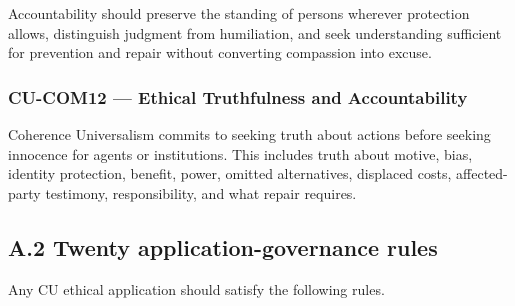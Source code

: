\documentclass[
  11pt,
]{article}
\begin{document}
Accountability should preserve the standing of persons wherever
protection allows, distinguish judgment from humiliation, and seek
understanding sufficient for prevention and repair without converting
compassion into excuse.

\subsubsection{CU-COM12 --- Ethical Truthfulness and
Accountability}\label{cu-com12-ethical-truthfulness-and-accountability-1}

Coherence Universalism commits to seeking truth about actions before
seeking innocence for agents or institutions. This includes truth about
motive, bias, identity protection, benefit, power, omitted alternatives,
displaced costs, affected-party testimony, responsibility, and what
repair requires.

\subsection{A.2 Twenty application-governance
rules}\label{a.2-twenty-application-governance-rules}

Any CU ethical application should satisfy the following rules.
\end{document}
